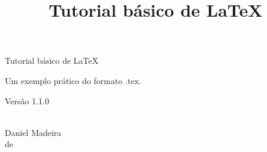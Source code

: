 \documentclass[a4paper,12pt,oneside]{book}
\title{Tutorial básico de \LaTeX} %
\author{\nomeautor} %
\date{\mesano} %
\newcommand{\nomeautor}{Daniel Madeira}
\newcommand{\mesano}{\DTMportugesmonthname{\the\month} de \the\year}
\newcommand{\versaomaior}{1}
\newcommand{\versaomenor}{1}
\newcommand{\versaodecorrecao}{0}
\newenvironment{folharosto}[1]
    {\begin{center}
        \vspace*{\fill}
        {\LARGE #1}\par
        \vspace{2cm}
    }
    {
        \vspace*{\fill}
        \\\large\nomeautor\\\vspace{0.8cm}\small\mesano
        \thispagestyle{empty}
        \renewcommand{\thepage}{rosto}
    \end{center}
    }
\begin{document}
\begin{titlepage}
    \maketitle %
    \renewcommand{\thepage}{capa} %
\end{titlepage}

\pagecolor{gray!5!yellow!5} %

\begin{folharosto}{Tutorial básico de \LaTeX}
Um exemplo prático do formato .tex.\par\vspace{1cm}
Versão \versaomaior.\versaomenor.\versaodecorrecao
\end{folharosto}
\end{document}
